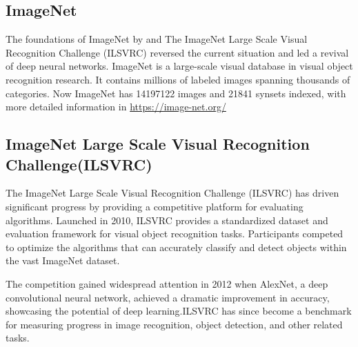 \documentclass[a4paper]{article}
\begin{document}
\subsection{ImageNet}
The foundations of ImageNet by \citet{imagenet_cvpr09} and The ImageNet Large Scale Visual Recognition Challenge (ILSVRC) \citep{ILSVRC15} reversed the current situation and led a revival of deep neural networks. ImageNet is a large-scale visual database in visual object recognition research. It contains millions of labeled images spanning thousands of categories. Now ImageNet has 14197122 images and 21841 synsets indexed, with more detailed information in \url{https://image-net.org/}

\subsection{ImageNet Large Scale Visual Recognition Challenge(ILSVRC)}
The ImageNet Large Scale Visual Recognition Challenge (ILSVRC)\citep{ILSVRC15} has driven significant progress by providing a competitive platform for evaluating algorithms. Launched in 2010, ILSVRC provides a standardized dataset and evaluation framework for visual object recognition tasks. Participants competed to optimize the  algorithms that can accurately classify and detect objects within the vast ImageNet dataset.

The competition gained widespread attention in 2012 when AlexNet\citep{Krizhevsky2012ImageNetCW}, a deep convolutional neural network, achieved a dramatic improvement in accuracy, showcasing the potential of deep learning.ILSVRC has since become a benchmark for measuring progress in image recognition, object detection, and other related tasks.
\end{document}
